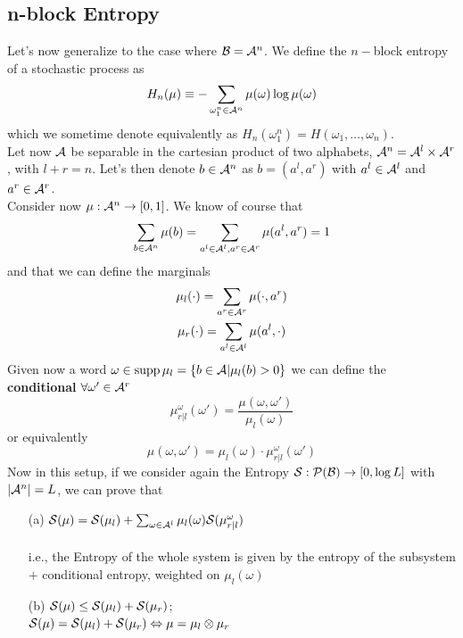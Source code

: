  \subsection{n-block Entropy}
 \label{par:n_block_entropy}
Let's now generalize to the case where $\mathcal{B} = \mathcal{A}^n$. We define the $n-$block entropy of a stochastic process as 
\begin{equation}
    \label{eq:n_block_entropy}
    H_n(\mu) \equiv - \sum_{\omega_1^n \in \mathcal{A}^n} \mu(\omega) \log \mu(\omega) 
\end{equation}
which we sometime denote equivalently as $H_n(\omega_1^n) = H(\omega_1, \dots, \omega_n)$. 
\\Let now $\mathcal{A}$ be separable in the cartesian product of two alphabets, $\mathcal{A}^n = \mathcal{A}^l \times \mathcal{A}^r$, with $l+r=n$. Let's then denote $b \in \mathcal{A}^n$ as $b=(a^l, a^r)$ with $a^l \in \mathcal{A}^l$ and $a^r \in \mathcal{A}^r$.
\\Consider now $\mu: \mathcal{A}^n \rightarrow [0, 1]$. We know of course that 
\begin{equation*}
    \sum_{b \in \mathcal{A}^n} \mu(b) = \sum_{a^l \in \mathcal{A}^l, a^r \in \mathcal{A}^r} \mu(a^l, a^r) = 1
\end{equation*}
and that we can define the marginals 
\begin{gather*}
    \mu_l (\cdot) = \sum_{a^r \in \mathcal{A}^r} \mu(\cdot, a^r) \\
    \mu_r (\cdot) = \sum_{a^l \in \mathcal{A}^l} \mu(a^l, \cdot)
\end{gather*}
Given now a word $\omega \in \text{supp}\, \mu_l = \{ b \in \mathcal{A} | \mu_l(b) > 0 \}$ we can define the \textbf{conditional} $\forall \omega' \in \mathcal{A}^r$
\begin{equation}
    \mu^{\omega}_{r|l} (\omega') = \frac{\mu(\omega, \omega')}{\mu_l(\omega)}
\end{equation}
or equivalently 
\begin{equation}
    \mu(\omega, \omega') = \mu_l(\omega) \cdot \mu^{\omega}_{r|l} (\omega')
\end{equation}
Now in this setup, if we consider again the Entropy $\mathcal{S} : \mathcal{P}(\mathcal{B}) \rightarrow [0, \log L]$ with $|\mathcal{A}^n| = L$, we can prove that 
\begin{prop}
\hfill
    \begin{itemize}
        \item[(a)] $\mathcal{S} (\mu) = \mathcal{S}(\mu_l) + \sum_{\omega \in \mathcal{A}^l} \mu_l(\omega) \mathcal{S} (\mu^{\omega}_{r|l})$ 
        \\\\i.e., the Entropy of the whole system is given by the entropy of the subsystem $+$ conditional entropy, weighted on $\mu_l(\omega)$
        \item[(b)] $\mathcal{S}(\mu) \leq \mathcal{S}(\mu_l) + \mathcal{S}(\mu_r)$;
        \\ $\mathcal{S}(\mu) = \mathcal{S}(\mu_l) + \mathcal{S}(\mu_r) \Leftrightarrow \mu = \mu_l \otimes \mu_r$
    \end{itemize}
\end{prop}
